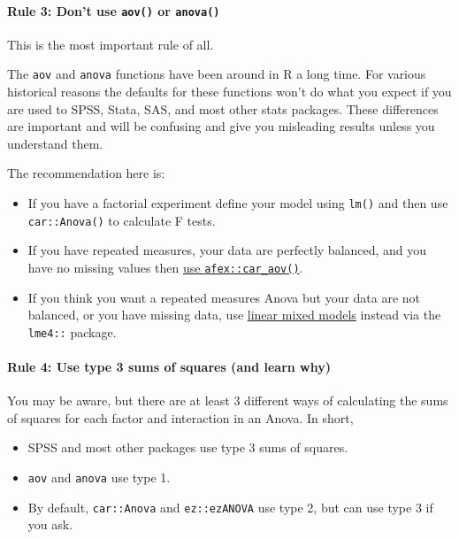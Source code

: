 \documentclass[]{article}
\providecommand{\tightlist}{%
  \setlength{\itemsep}{0pt}\setlength{\parskip}{0pt}}
\let\oldparagraph\paragraph
\renewcommand{\paragraph}[1]{\oldparagraph{#1}\mbox{}}
\begin{document}
\hypertarget{rule-3-dont-use-aov-or-anova}{%
\paragraph{\texorpdfstring{Rule 3: Don't use \texttt{aov()} or \texttt{anova()}}{Rule 3: Don't use aov() or anova()}}\label{rule-3-dont-use-aov-or-anova}}

This is the most important rule of all.

The \texttt{aov} and \texttt{anova} functions have been around in R a long time. For various
historical reasons the defaults for these functions won't do what you expect if
you are used to SPSS, Stata, SAS, and most other stats packages. These
differences are important and will be confusing and give you misleading results
unless you understand them.

The recommendation here is:

\begin{itemize}
\item
  If you have a factorial experiment define your model using \texttt{lm()} and then
  use \texttt{car::Anova()} to calculate F tests.
\item
  If you have repeated measures, your data are perfectly balanced, and you
  have no missing values then \protect\hyperlink{repeated-measures}{use \texttt{afex::car\_aov()}}.
\item
  If you think you want a repeated measures Anova but your data are not
  balanced, or you have missing data, use
  \protect\hyperlink{multilevel-models}{linear mixed models} instead via the \texttt{lme4::} package.
\end{itemize}

\hypertarget{sums-squares}{%
\paragraph{Rule 4: Use type 3 sums of squares (and learn why)}\label{sums-squares}}

You may be aware, but there are at least 3 different ways of calculating the
sums of squares for each factor and interaction in an Anova. In short,

\begin{itemize}
\tightlist
\item
  SPSS and most other packages use type 3 sums of squares.
\item
  \texttt{aov} and \texttt{anova} use type 1.
\item
  By default, \texttt{car::Anova} and \texttt{ez::ezANOVA} use type 2, but can use type 3 if
  you ask.
\end{itemize}
\end{document}
